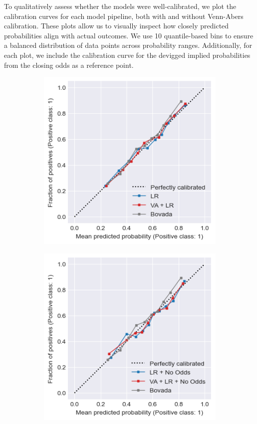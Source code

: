 \documentclass[12pt,twoside]{report}
\begin{document}
To qualitatively assess whether the models were well-calibrated, we plot the calibration curves for each model pipeline, both with and without Venn-Abers calibration. These plots allow us to visually inspect how closely predicted probabilities align with actual outcomes. We use 10 quantile-based bins to ensure a balanced distribution of data points across probability ranges. Additionally, for each plot, we include the calibration curve for the devigged implied probabilities from the closing odds as a reference point.

\begin{figure}[htb]
\centering
\captionsetup{justification=centering}
\begin{subfigure}{.5\linewidth}
  \centering
  \includegraphics[width=0.9\linewidth]{figures/calib_lr_and_va.png}
\end{subfigure}%
\begin{subfigure}{.5\linewidth}
  \centering
  \includegraphics[width=0.9\linewidth]{figures/calib_lr_no_odds_and_va.png}

\end{subfigure}
\end{figure}
\end{document}
